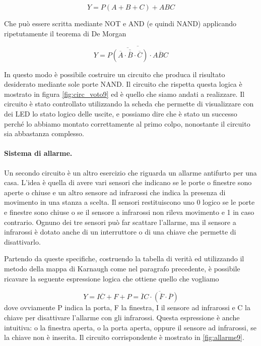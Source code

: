 \begin{equation}
	Y = P(A + B + C) + ABC
	\label{eq:logic9}
\end{equation}

Che può essere scritta mediante NOT e AND (e quindi NAND) applicando ripetutamente il
teorema di De Morgan

\begin{equation}
	Y = \overline{\overline{P(\overline{\overline{A} \cdot \overline{B} \cdot \overline{C}})} \cdot \overline{ABC}}
\end{equation}

In questo modo è possibile costruire un circuito che produca il risultato desiderato mediante
sole porte NAND. Il circuito che rispetta questa logica è mostrato in figura \ref{fig:circ_voto9}
ed è quello che siamo andati a realizzare. Il circuito è stato controllato utilizzando la
scheda che permette di visualizzare con dei LED lo stato logico delle uscite, e possiamo
dire che è stato un successo perché lo abbiamo montato correttamente al primo colpo, nonostante
il circuito sia abbastanza complesso.

\paragraph{Sistema di allarme.}

Un secondo circuito è un altro esercizio che riguarda un allarme antifurto per una casa.
L'idea è quella di avere vari sensori che indicano se le porte o finestre sono aperte o chiuse e
un altro sensore ad infrarossi che indica la presenza di movimento in una stanza a scelta.
Il sensori restituiscono uno 0 logico se le porte e finestre sono chiuse o se il sensore a infrarossi
non rileva movimento e 1 in caso contrario. Ognuno dei tre sensori può far scattare l'allarme,
ma il sensore a infrarossi è dotato anche di un interruttore o di una chiave che permette di disattivarlo.

Partendo da queste specifiche, costruendo la tabella di verità ed utilizzando il metodo della mappa
di Karnaugh come nel paragrafo precedente, è possibile ricavare la seguente espressione logica che
ottiene quello che vogliamo

\begin{equation}
	Y = I\overline{C} + F + P = \overline{\overline{I}C \cdot (\overline{F}\cdot\overline{P})}
\end{equation}
%
dove ovviamente P indica la porta, F la finestra, I il sensore ad infrarossi e C la chiave per disattivare
l'allarme con gli infrarossi. Questa espressione è anche intuitiva: o la finestra aperta, o la porta aperta,
oppure il sensore ad infrarossi, se la chiave non è inserita. Il circuito corrispondente è mostrato in \ref{fig:allarme9}.

